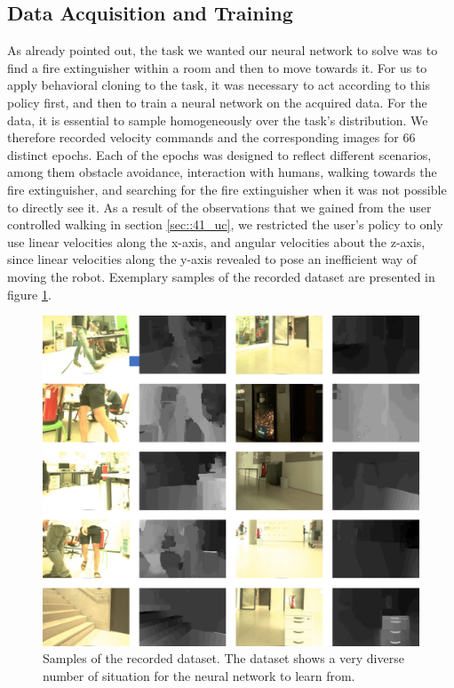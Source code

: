 \subsection{Data Acquisition and Training}
\label{sec::423_da}
As already pointed out, the task we wanted our neural network to solve was to find a fire extinguisher within a room and then to move towards it. For us to apply behavioral cloning to the task, it was necessary to act according to this policy first, and then to train a neural network on the acquired data. For the data, it is essential to sample homogeneously over the task's distribution. We therefore recorded velocity commands and the corresponding images for 66 distinct epochs. Each of the epochs was designed to reflect different scenarios, among them obstacle avoidance, interaction with humans, walking towards the fire extinguisher, and searching for the fire extinguisher when it was not possible to directly see it. As a result of the observations that we gained from the user controlled walking in section \ref{sec::41_uc}, we restricted the user's policy to only use linear velocities along the x-axis, and angular velocities about the z-axis, since linear velocities along the y-axis revealed to pose an inefficient way of moving the robot. Exemplary samples of the recorded dataset are presented in figure \ref{fig::423_dataset}.
\begin{figure}[h!]
	\centering
	\includegraphics[scale=.4]{chapters/04_experiments/02_autonomous_walking/dataset_diversity.png}
	\caption{Samples of the recorded dataset. The dataset shows a very diverse number of situation for the neural network to learn from.}
	\label{fig::423_dataset}
\end{figure}
